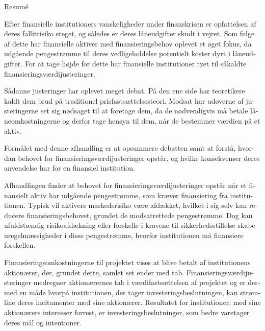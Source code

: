 \documentclass[main.tex]{subfiles}
\begin{document}
    \begin{otherlanguage}{danish}
    \thispagestyle{empty}
    \begin{center}
    {\LARGE Resumé}
    \end{center}

    Efter finansielle institutioners vanskeligheder under finanskrisen 
    er opfattelsen af deres fallitrisiko steget, og således er deres låneudgifter skudt i vejret.
    Som følge af dette har finansielle aktiver med finansieringsbehov oplevet et øget fokus, 
    da udgående pengestrømme til deres vedligeholdelse potentielt koster dyrt i låneudgifter.
    For at tage højde for dette
    har finansielle institutioner tyet til såkaldte finansieringsværdijusteringer.

    Sådanne justeringer har oplevet meget debat. 
    På den ene side har teoretikere kaldt dem brud på traditionel prisfastsættelsesteori.
    Modsat har udøverne af justeringerne set sig nødsaget til at foretage dem,
    da de nødvendigvis må betale låneomkostningerne 
    og derfor tage hensyn til dem, når de bestemmer værdien på et aktiv. 

    Formålet med denne afhandling er at opsummere debatten
    samt at forstå, hvordan behovet for finansieringsværdijusteringer opstår, 
    og hvilke konsekvenser deres anvendelse har for en finansiel institution. 

    Afhandlingen finder at behovet for finansieringsværdijusteringer opstår 
    når et finansielt aktiv har udgående pengestrømme, som kræver finansiering fra institutionen.
    Typisk vil aktivers markedsrisiko være afdækket,
    hvilket i sig selv kan reducere finansieringsbehovet, grundet de modsatrettede pengestrømme.
    Dog kan ufuldstændig risikoafdækning eller forskelle i kravene til sikkerhedsstillelse
    skabe uregelmæssigheder i disse pengestrømme, hvorfor institutionen må finansiere forskellen.
    
    Finansieringsomkostningerne til projektet vises at blive betalt af institutionens aktionærer,
    der, grundet dette, samlet set ender med tab.
    Finansieringsværdijusteringer medregner aktionærernes tab i værdifastsættelsen af projektet
    og er dermed en måde hvorpå institutionen, der tager investeringsbeslutningen, 
    kan strømline deres incitamenter med sine aktionærer. 
    Resultatet for institutioner, med sine aktionærers interesser forrest,
    er investeringsbeslutninger, som bedre varetager deres mål og intentioner.
    
    \end{otherlanguage}
\end{document}
